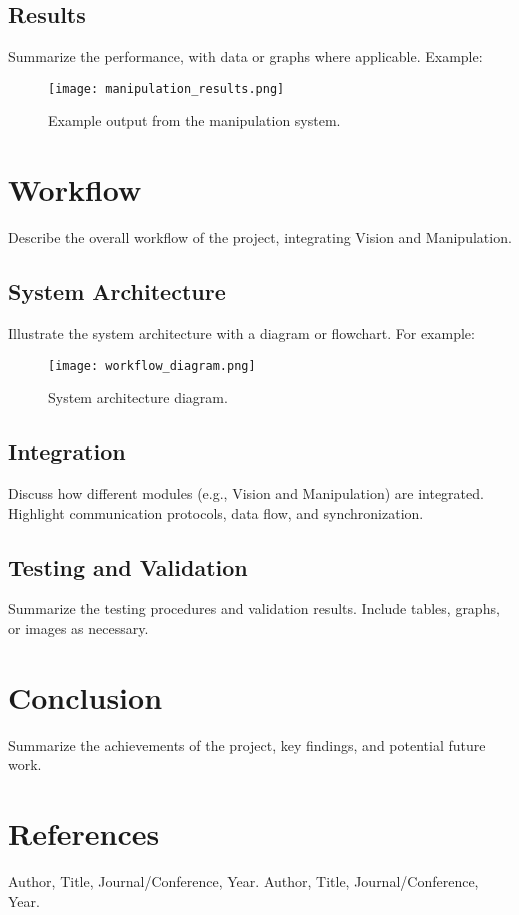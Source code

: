 \documentclass[12pt,a4paper]{article}
\begin{document}
\subsection{Results}
Summarize the performance, with data or graphs where applicable. Example:
\begin{figure}[h!]
    \centering
    \texttt{[image: manipulation\_results.png]} %
    \caption{Example output from the manipulation system.}
    \label{fig:manipulation_results}
\end{figure}

\section{Workflow}
Describe the overall workflow of the project, integrating Vision and Manipulation.

\subsection{System Architecture}
Illustrate the system architecture with a diagram or flowchart. For example:
\begin{figure}[h!]
    \centering
    \texttt{[image: workflow\_diagram.png]} %
    \caption{System architecture diagram.}
    \label{fig:workflow_diagram}
\end{figure}

\subsection{Integration}
Discuss how different modules (e.g., Vision and Manipulation) are integrated. Highlight communication protocols, data flow, and synchronization.

\subsection{Testing and Validation}
Summarize the testing procedures and validation results. Include tables, graphs, or images as necessary.

\section{Conclusion}
Summarize the achievements of the project, key findings, and potential future work. 

\section*{References}
\begin{thebibliography}{99}
     Author, Title, Journal/Conference, Year.
     Author, Title, Journal/Conference, Year.
\end{thebibliography}
\end{document}
